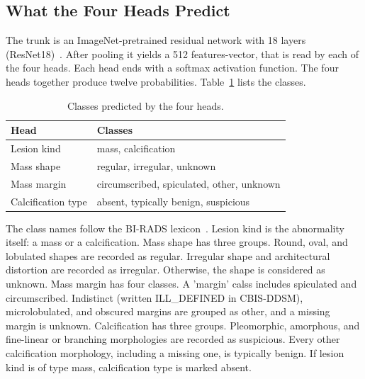 \subsection{What the Four Heads Predict}
\label{sec:concepts}

The trunk is an ImageNet-pretrained residual network with 18 layers (ResNet18)~\cite{he2016resnet}. After pooling it yields a 512 features-vector, that is read by each of the four heads. Each head ends with a softmax activation function. The four heads together produce twelve probabilities. Table~\ref{tab:heads} lists the classes.

\begin{table}[!t]
\caption{Classes predicted by the four heads.}
\label{tab:heads}
\centering
\footnotesize
\begin{tabular}{@{}l p{3.55cm}@{}}
\toprule
Head & Classes \\
\midrule
Lesion kind & mass, calcification \\
Mass shape & regular, irregular, unknown \\
Mass margin & circumscribed, spiculated, other, unknown \\
Calcification type & absent, typically benign, suspicious \\
\bottomrule
\end{tabular}
\end{table}

The class names follow the BI-RADS lexicon~\cite{acr2013birads,lee2017cbis}. Lesion kind is the abnormality itself: a mass or a calcification. Mass shape has three groups. Round, oval, and lobulated shapes are recorded as regular. Irregular shape and architectural distortion are recorded as irregular. Otherwise, the shape is considered as unknown. Mass margin has four classes. A 'margin' calss includes spiculated and circumscribed. Indistinct (written ILL\_DEFINED in CBIS-DDSM), microlobulated, and obscured margins are grouped as other, and a missing margin is unknown. Calcification has three groups. Pleomorphic, amorphous, and fine-linear or branching morphologies are recorded as suspicious. Every other calcification morphology, including a missing one, is typically benign. If lesion kind is of type mass, calcification type is marked absent.

